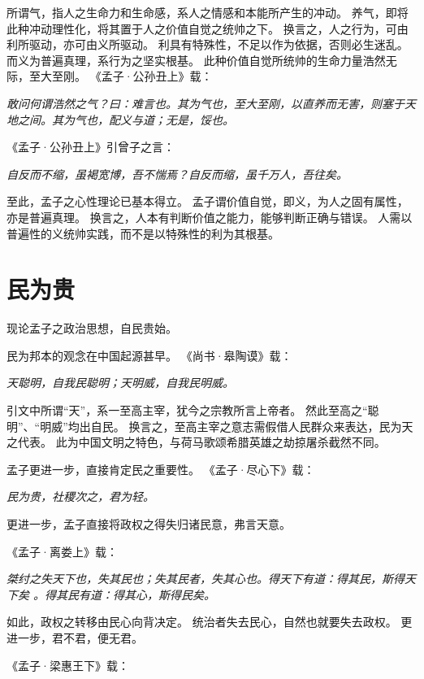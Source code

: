 \documentclass[11pt]{article}
\begin{document}
\par

所谓气，指人之生命力和生命感，系人之情感和本能所产生的冲动。
养气，即将此种冲动理性化，将其置于人之价值自觉之统帅之下。
换言之，人之行为，可由利所驱动，亦可由义所驱动。
利具有特殊性，不足以作为依据，否则必生迷乱。
而义为普遍真理，系行为之坚实根基。
此种价值自觉所统帅的生命力量浩然无际，至大至刚。
《孟子·公孙丑上》载：

\textit{敢问何谓浩然之气？曰：难言也。其为气也，至大至刚，以直养而无害，则塞于天地之间。其为气也，配义与道；无是，馁也。}

《孟子·公孙丑上》引曾子之言：

\textit{自反而不缩，虽褐宽博，吾不惴焉？自反而缩，虽千万人，吾往矣。}

\par

至此，孟子之心性理论已基本得立。
孟子谓价值自觉，即义，为人之固有属性，亦是普遍真理。
换言之，人本有判断价值之能力，能够判断正确与错误。
人需以普遍性的义统帅实践，而不是以特殊性的利为其根基。
  
\section{民为贵}
现论孟子之政治思想，自民贵始。

\par

民为邦本的观念在中国起源甚早。
《尚书·皋陶谟》载：
  
\textit{天聪明，自我民聪明；天明威，自我民明威。}

引文中所谓“天”，系一至高主宰，犹今之宗教所言上帝者。
然此至高之“聪明”、“明威”均出自民。
换言之，至高主宰之意志需假借人民群众来表达，民为天之代表。
此为中国文明之特色，与荷马歌颂希腊英雄之劫掠屠杀截然不同。

\par

孟子更进一步，直接肯定民之重要性。
《孟子·尽心下》载：

\textit{民为贵，社稷次之，君为轻。}

更进一步，孟子直接将政权之得失归诸民意，弗言天意。

《孟子·离娄上》载：

\textit{桀纣之失天下也，失其民也；失其民者，失其心也。得天下有道：得其民，斯得天下矣 。得其民有道：得其心，斯得民矣。}

如此，政权之转移由民心向背决定。
统治者失去民心，自然也就要失去政权。
更进一步，君不君，便无君。

《孟子·梁惠王下》载：
  
\end{document}
